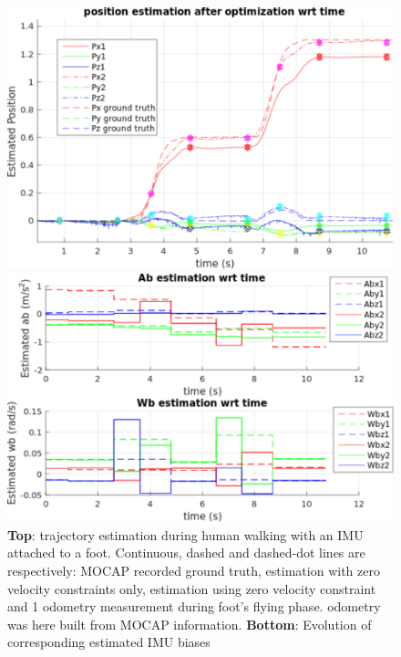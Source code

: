 \begin{figure}[tb]
\centering
\includegraphics[scale=0.5]{figures/Result_position}
\par\vspace{4mm}
\includegraphics[scale=0.5]{figures/Result_bias}
\caption{ 
{\bf Top}: trajectory estimation during human walking with an IMU attached to a foot. Continuous, dashed and dashed-dot lines are respectively: MOCAP recorded ground truth, 
estimation with zero velocity constraints only, estimation using zero velocity constraint and 1 odometry measurement during foot's flying phase. odometry was here built from MOCAP information.
{\bf Bottom}: Evolution of corresponding estimated IMU biases 
}
\label{fig:forward_walk_IRI}
\end{figure}

